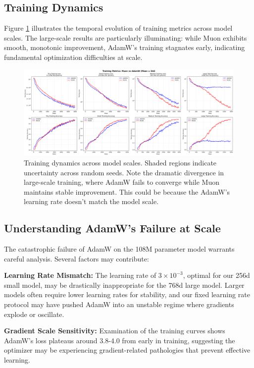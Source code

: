 \documentclass[11pt,a4paper]{article}
\begin{document}
\subsection{Training Dynamics}

Figure \ref{fig:training_curves} illustrates the temporal evolution of training metrics across model scales. The large-scale results are particularly illuminating: while Muon exhibits smooth, monotonic improvement, AdamW's training stagnates early, indicating fundamental optimization difficulties at scale.

\begin{figure}[H]
    \centering
    \includegraphics[width=\textwidth]{results/experiment_2_model_size/training_curves_with_uncertainty.png}
    \caption{Training dynamics across model scales. Shaded regions indicate uncertainty across random seeds. Note the dramatic divergence in large-scale training, where AdamW fails to converge while Muon maintains stable improvement. This could be because the AdamW's learning rate doesn't match the model scale.}
    \label{fig:training_curves}
\end{figure}

\subsection{Understanding AdamW's Failure at Scale}

The catastrophic failure of AdamW on the 108M parameter model warrants careful analysis. Several factors may contribute:

\textbf{Learning Rate Mismatch:} The learning rate of $3 \times 10^{-3}$, optimal for our 256d small model, may be drastically inappropriate for the 768d large model. Larger models often require lower learning rates for stability, and our fixed learning rate protocol may have pushed AdamW into an unstable regime where gradients explode or oscillate.

\textbf{Gradient Scale Sensitivity:} Examination of the training curves shows AdamW's loss plateaus around 3.8-4.0 from early in training, suggesting the optimizer may be experiencing gradient-related pathologies that prevent effective learning.
\end{document}
